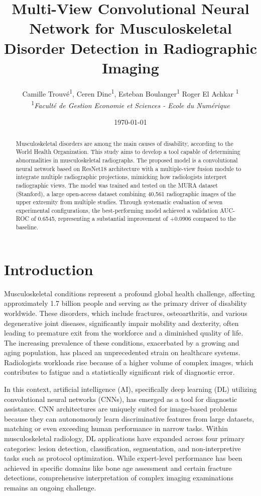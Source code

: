 \documentclass[12pt,a4paper]{article}
\title{Multi-View Convolutional Neural Network for Musculoskeletal Disorder Detection in Radiographic Imaging}
\author{
    Camille Trouvé\textsuperscript{1},
    Ceren Dinc\textsuperscript{1},
    Esteban Boulanger\textsuperscript{1}
    Roger El Achkar \textsuperscript{1} \\
    \textsuperscript{1}\textit{Faculté de Gestion Economie et Sciences - Ecole du Numérique} \\
}
\date{\today}
\begin{document}
\maketitle

\begin{abstract}
Musculoskeletal disorders are among the main causes of disability, according to the World Health Organization. This study aims to develop a tool capable of determining abnormalities in musculoskeletal radiographs. The proposed model is a convolutional neural network based on ResNet18 architecture with a multiple-view fusion module to integrate multiple radiographic projections, mimicking how radiologists interpret radiographic views. The model was trained and tested on the MURA dataset (Stanford), a large open-access dataset combining 40,561 radiographic images of the upper extremity from multiple studies. Through systematic evaluation of seven experimental configurations, the best-performing model achieved a validation AUC-ROC of 0.6545, representing a substantial improvement of +0.0906 compared to the baseline.
\end{abstract}

\section{Introduction}
\label{sec:introduction}

Musculoskeletal conditions represent a profound global health challenge, affecting approximately 1.7 billion people and serving as the primary driver of disability worldwide\cite{rajpurkar_mura_2018}. These disorders, which include fractures, osteoarthritis, and various degenerative joint diseases, significantly impair mobility and dexterity, often leading to premature exit from the workforce and a diminished quality of life. The increasing prevalence of these conditions, exacerbated by a growing and aging population, has placed an unprecedented strain on healthcare systems\cite{chada_machine_2019}. Radiologists  workloads rise because of a higher volume of complex images, which contributes to fatigue and a statistically significant risk of diagnostic error\cite{rajpurkar_mura_2018,chea_current_2020,singh_hybrid_2022}.

In this context, artificial intelligence (AI), specifically deep learning (DL) utilizing convolutional neural networks (CNNs), has emerged as a tool for diagnostic assistance\cite{chada_machine_2019,chea_current_2020,dangelo_artificial_2022}. CNN architectures are uniquely suited for image-based problems because they can autonomously learn discriminative features from large datasets, matching or even exceeding human performance in narrow tasks\cite{chea_current_2020,singh_hybrid_2022}. Within musculoskeletal radiology, DL applications have expanded across four primary categories: lesion detection, classification, segmentation, and non-interpretive tasks such as protocol optimization. While expert-level performance has been achieved in specific domains like bone age assessment and certain fracture detections, comprehensive interpretation of complex imaging examinations remains an ongoing challenge\cite{chea_current_2020,dangelo_artificial_2022}.
\end{document}
